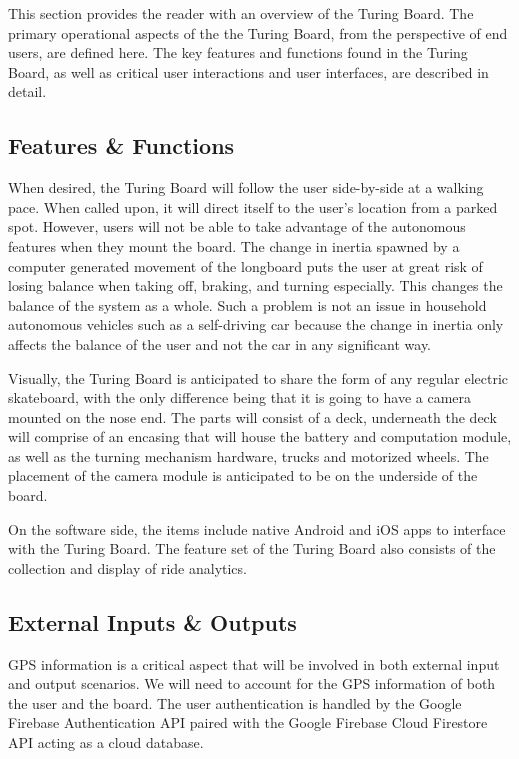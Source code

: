 This section provides the reader with an overview of the Turing Board. The primary operational aspects of the the Turing Board, from the perspective of end users, are defined here. The key features and functions found in the Turing Board, as well as critical user interactions and user interfaces, are described in detail.

\subsection{Features \& Functions}
When desired, the Turing Board will follow the user side-by-side at a walking pace. When called upon, it will direct itself to the user's location from a parked spot. However, users will not be able to take advantage of the autonomous features when they mount the board. The change in inertia spawned by a computer generated movement of the longboard puts the user at great risk of losing balance when taking off, braking, and turning especially. This changes the balance of the system as a whole. Such a problem is not an issue in household autonomous vehicles such as a self-driving car because the change in inertia only affects the balance of the user and not the car in any significant way. 

Visually, the Turing Board is anticipated to share the form of any regular electric skateboard, with the only difference being that it is going to have a camera mounted on the nose end. The parts will consist of a deck, underneath the deck will comprise of an encasing that will house the battery and computation module, as well as the turning mechanism hardware, trucks and motorized wheels. The placement of the camera module is anticipated to be on the underside of the board.

On the software side, the items include native Android and iOS apps to interface with the Turing Board. The feature set of the Turing Board also consists of the collection and display of ride analytics.

\subsection{External Inputs \& Outputs}
GPS information is a critical aspect that will be involved in both external input and output scenarios. We will need to account for the GPS information of both the user and the board. The user authentication is handled by the Google Firebase Authentication API paired with the Google Firebase Cloud Firestore API acting as a cloud database. 

